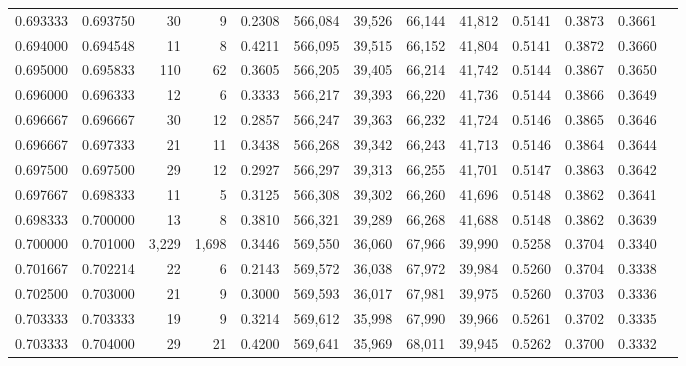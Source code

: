 \begin{tabular}{rrrrrrrrrrrrr}
0.693333 & 0.693750 &     30 &     9 &                                     0.2308 & 566,084 &  39,526 &  66,144 &  41,812 & 0.5141 & 0.3873 & 0.3661 \\
0.694000 & 0.694548 &     11 &     8 &                                     0.4211 & 566,095 &  39,515 &  66,152 &  41,804 & 0.5141 & 0.3872 & 0.3660 \\
0.695000 & 0.695833 &    110 &    62 &                                     0.3605 & 566,205 &  39,405 &  66,214 &  41,742 & 0.5144 & 0.3867 & 0.3650 \\
0.696000 & 0.696333 &     12 &     6 &                                     0.3333 & 566,217 &  39,393 &  66,220 &  41,736 & 0.5144 & 0.3866 & 0.3649 \\
0.696667 & 0.696667 &     30 &    12 &                                     0.2857 & 566,247 &  39,363 &  66,232 &  41,724 & 0.5146 & 0.3865 & 0.3646 \\
0.696667 & 0.697333 &     21 &    11 &                                     0.3438 & 566,268 &  39,342 &  66,243 &  41,713 & 0.5146 & 0.3864 & 0.3644 \\
0.697500 & 0.697500 &     29 &    12 &                                     0.2927 & 566,297 &  39,313 &  66,255 &  41,701 & 0.5147 & 0.3863 & 0.3642 \\
0.697667 & 0.698333 &     11 &     5 &                                     0.3125 & 566,308 &  39,302 &  66,260 &  41,696 & 0.5148 & 0.3862 & 0.3641 \\
0.698333 & 0.700000 &     13 &     8 &                                     0.3810 & 566,321 &  39,289 &  66,268 &  41,688 & 0.5148 & 0.3862 & 0.3639 \\
0.700000 & 0.701000 &  3,229 & 1,698 &                                     0.3446 & 569,550 &  36,060 &  67,966 &  39,990 & 0.5258 & 0.3704 & 0.3340 \\
0.701667 & 0.702214 &     22 &     6 &                                     0.2143 & 569,572 &  36,038 &  67,972 &  39,984 & 0.5260 & 0.3704 & 0.3338 \\
0.702500 & 0.703000 &     21 &     9 &                                     0.3000 & 569,593 &  36,017 &  67,981 &  39,975 & 0.5260 & 0.3703 & 0.3336 \\
0.703333 & 0.703333 &     19 &     9 &                                     0.3214 & 569,612 &  35,998 &  67,990 &  39,966 & 0.5261 & 0.3702 & 0.3335 \\
0.703333 & 0.704000 &     29 &    21 &                                     0.4200 & 569,641 &  35,969 &  68,011 &  39,945 & 0.5262 & 0.3700 & 0.3332 \\

\end{tabular}
